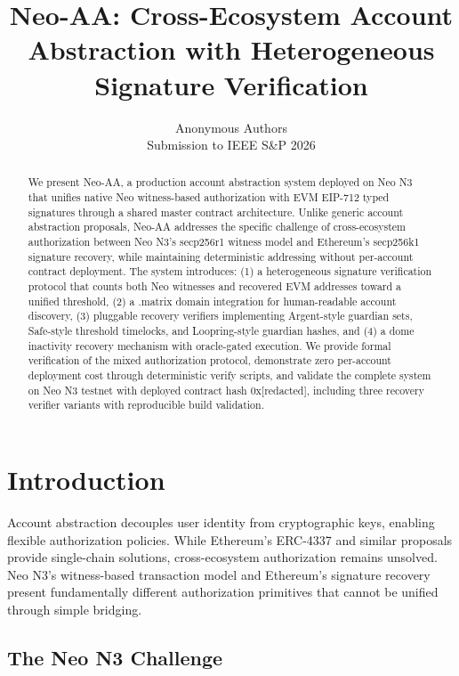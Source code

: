 \documentclass[10pt,twocolumn]{article}
\begin{document}
\title{Neo-AA: Cross-Ecosystem Account Abstraction with Heterogeneous Signature Verification}
\author{Anonymous Authors\\\small Submission to IEEE S\&P 2026}
\maketitle

\begin{abstract}
We present Neo-AA, a production account abstraction system deployed on Neo N3 that unifies native Neo witness-based authorization with EVM EIP-712 typed signatures through a shared master contract architecture. Unlike generic account abstraction proposals, Neo-AA addresses the specific challenge of cross-ecosystem authorization between Neo N3's secp256r1 witness model and Ethereum's secp256k1 signature recovery, while maintaining deterministic addressing without per-account contract deployment. The system introduces: (1) a heterogeneous signature verification protocol that counts both Neo witnesses and recovered EVM addresses toward a unified threshold, (2) a .matrix domain integration for human-readable account discovery, (3) pluggable recovery verifiers implementing Argent-style guardian sets, Safe-style threshold timelocks, and Loopring-style guardian hashes, and (4) a dome inactivity recovery mechanism with oracle-gated execution. We provide formal verification of the mixed authorization protocol, demonstrate zero per-account deployment cost through deterministic verify scripts, and validate the complete system on Neo N3 testnet with deployed contract hash 0x[redacted], including three recovery verifier variants with reproducible build validation.
\end{abstract}

\section{Introduction}

Account abstraction decouples user identity from cryptographic keys, enabling flexible authorization policies. While Ethereum's ERC-4337 and similar proposals provide single-chain solutions, cross-ecosystem authorization remains unsolved. Neo N3's witness-based transaction model and Ethereum's signature recovery present fundamentally different authorization primitives that cannot be unified through simple bridging.

\subsection{The Neo N3 Challenge}
\end{document}
